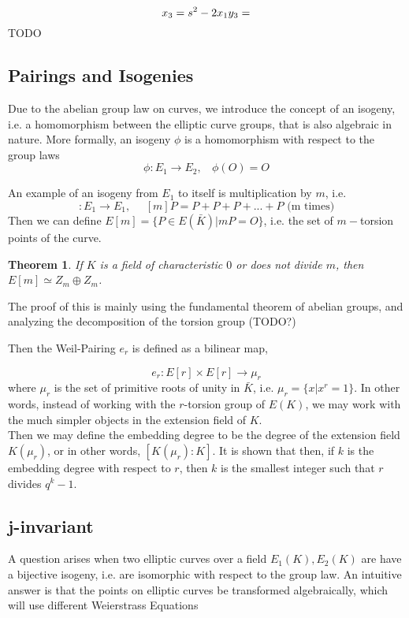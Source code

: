 \documentclass[12pt,twoside]{article}
\newtheorem{theorem}{Theorem}
\begin{document}
\begin{equation}
x_{3} = s^{2} - 2x_{1} \\
y_{3} = 
\end{equation} 
TODO




\subsection{Pairings and Isogenies} 
Due to the abelian group law on curves, we introduce the concept of an isogeny, i.e. a homomorphism between the elliptic curve groups, that is also algebraic in nature. More formally, an isogeny $\phi$ is a homomorphism with respect to the group laws
$$ \phi: E_{1} \rightarrow E_{2}, \> \> \> \> \phi(O) = O $$

An example of an isogeny from $E_{1}$ to itself is multiplication by $m$, i.e. 
\begin{equation} 
[m]: E_{1} \rightarrow E_{1}, \> \> \> \> \> \> [m]P = P+P+P+...+P \textrm{  (m times)}
\end{equation}
Then we can define $E[m] = \{P \in E(\bar{K}) | mP = O \}$, i.e. the set of $m-$torsion points of the curve. 
\begin{theorem} 
If $K$ is a field of characteristic $0$ or does not divide $m$, then
$ E[m] \simeq Z_{m} \oplus Z_{m}$.  
\end{theorem} 
The proof of this is mainly using the fundamental theorem of abelian groups, and analyzing the decomposition of the torsion group (TODO?) 

Then the Weil-Pairing $e_{r}$ is defined as a bilinear map,  

\begin{equation} 
e_{r}: E[r] \times E[r] \rightarrow \mu_{r}
\end{equation} where $\mu_{r}$ is the set of primitive roots of unity in $\bar{K}$, i.e. $\mu_{r} = \{x | x^{r} =1 \}$. In other words, instead of working with the $r$-torsion group of $E(K)$, we may work with the much simpler objects in the extension field of $K$. \\ 

Then we may define the embedding degree to be the degree of the extension field $K(\mu_{r})$, or in other words, $[K(\mu_{r}): K]$. It is shown that then, if $k$ is the embedding degree with respect to $r$, then $k$ is the smallest integer such that $r$ divides $q^{k} -1$. 
 
\subsection{j-invariant} 
A question arises when two elliptic curves over a field $E_{1}(K), E_{2}(K)$ are have a bijective isogeny, i.e. are isomorphic with respect to the group law. 
An intuitive answer is that the points on elliptic curves be transformed algebraically, which will use different Weierstrass Equations
\end{document}
